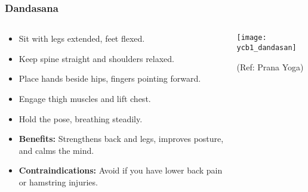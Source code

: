\begin{frame}[fragile]\frametitle{Dandasana}
\begin{columns}
    \begin{column}[T]{0.5\linewidth}
      \begin{itemize}
        \item Sit with legs extended, feet flexed.
        \item Keep spine straight and shoulders relaxed.
        \item Place hands beside hips, fingers pointing forward.
        \item Engage thigh muscles and lift chest.
        \item Hold the pose, breathing steadily.
        \item \textbf{Benefits:} Strengthens back and legs, improves posture, and calms the mind.
        \item \textbf{Contraindications:} Avoid if you have lower back pain or hamstring injuries.
      \end{itemize}
    \end{column}
    \begin{column}[T]{0.5\linewidth}
        \begin{center}
        \begin{center}
		        \texttt{[image: ycb1\_dandasan]}
				
				{\tiny (Ref: Prana Yoga)}	        
		\end{center}   
        \end{center}    
    \end{column}
  \end{columns}
\end{frame}

